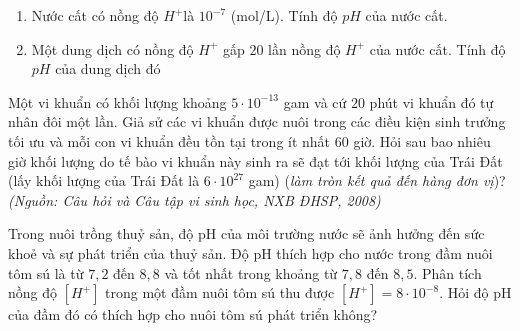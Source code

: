 \begin{ex}%
	\begin{enumerate}
		\item Nước cất có nồng độ $H^+$là $10^{-7}$ (mol/L). Tính độ  $pH$ của nước cất.
		\item Một dung  dịch có nồng độ $H^+$ gấp $20$ lần nồng độ $ H^+$ của nước cất. Tính độ $pH$ của dung dịch đó
	\end{enumerate}
\end{ex}

\begin{ex}%
	Một vi khuẩn có khối lượng khoảng $5\cdot10^{-13}$ gam và cứ $20$ phút vi khuẩn đó tự nhân đôi một lần. Giả sử các vi khuẩn được nuôi trong các điều kiện sinh trưởng tối ưu và mỗi con vi khuẩn đều tồn tại trong ít nhất $60$ giờ. Hỏi sau bao nhiêu giờ khối lượng do tế bào vi khuẩn này sinh ra sẽ đạt tới khối lượng của Trái Đất (lấy khối lượng của Trái Đất là $6\cdot 10^{27}$ gam) (\textit{làm tròn  kết quả đến hàng đơn vị})?\\
	\textit{(Nguồn: Câu hỏi và Câu tập vi sinh học,  NXB ĐHSP, 2008)}
\end{ex}

\begin{ex}%
	Trong nuôi  trồng thuỷ sản, độ pH của môi trường nước sẽ ảnh hưởng đến sức khoẻ và sự phát triển của thuỷ sản. Độ pH thích hợp cho nước trong đầm nuôi tôm sú là từ $7{,}2$ đến $8{,}8$ và tốt nhất trong khoảng từ $7{,}8$ đến $8{,}5$. Phân tích nồng độ $[H^{+}]$ trong một đầm nuôi tôm sú thu được $[H^{+}]=8\cdot 10^{-8}$. Hỏi độ pH của đầm đó có thích hợp cho nuôi tôm sú phát triển không?
\end{ex}

